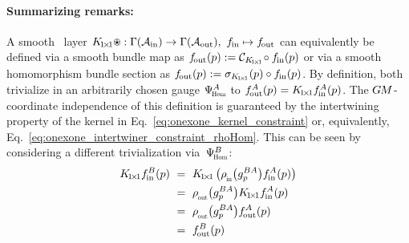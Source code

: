 \paragraph{Summarizing remarks:}
A smooth \onexoneGM\ layer $K_{\!1\!\times\!1} \ostar: \Gamma(\Ain)\to \Gamma(\Aout),\ \fin\mapsto \fout$ can equivalently be defined via a smooth bundle map as $\fout(p) := \mathcal{C}_{K_{\!1\!\times\!1}} \!\circ \fin(p)$ or via a smooth homomorphism bundle section as $f_\textup{\:\!\!out}(p) := \sigma_{K_{\!1\!\times\!1}}(p) \circ f_\textup{\;\!\!in}(p)$.
By definition, both trivialize in an arbitrarily chosen gauge $\PsiHom^A$ to $f_\textup{\:\!\!out}^A(p) = K_{\!1\!\times\!1} f_\textup{\;\!\!in}^A(p)$.
The $G\mkern-1.4muM$-coordinate independence of this definition is guaranteed by the intertwining property of the kernel in Eq.~\eqref{eq:onexone_kernel_constraint} or, equivalently, Eq.~\eqref{eq:onexone_intertwiner_constraint_rhoHom}.
This can be seen by considering a different trivialization via~$\PsiHom^B$:
\begin{align}
    K_{\!1\!\times\!1} \fin^B(p)
    \ &=\ K_{\!1\!\times\!1} \left( \rhoin\big(g^{BA}_p\big) \fin^A(p) \right) \notag \\
    \ &=\ \rhoout\big(g^{BA}_p\big) K_{\!1\!\times\!1} \fin^A(p) \notag \\
    \ &=\ \rhoout\big(g^{BA}_p\big) \fout^A(p) \notag \\
    \ &=\ \fout^B(p)
\end{align}
